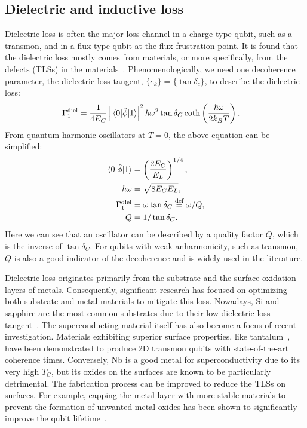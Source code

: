 \documentclass[a4paper,onecolumn,11pt,unpublished]{quantumarticle}
\newcommand{\setelem}[1]{\ensuremath{\{#1\}}}
\newcommand{\defeq}{\overset{\text{def}}{=}}
\begin{document}
\subsection{Dielectric and inductive loss}
Dielectric loss is often the major loss channel in a charge-type qubit, such as a transmon, and in a flux-type qubit at the flux frustration point.  It is found that the dielectric loss mostly comes from materials, or more specifically, from the defects (TLSs) in the materials~\cite{Martinis2005Decoherence}. Phenomenologically, we need one decoherence parameter, the dielectric loss tangent, $\setelem{e_k}=\setelem{\tan\delta_c}$, to describe the dielectric loss:
\begin{align}
  \Gamma_1^{\text{diel}} & = \frac{1}{4E_C}\left|\mel{0}{\hat{\phi}}{1}\right|^2\hbar \omega^2\tan\delta_C \coth\left(\frac{\hbar\omega}{2k_BT}\right). \label{eq:t1_dielectric}
\end{align}
From quantum harmonic oscillators at $T=0$, the above equation can be simplified:
\begin{align}
  \mel{0}{\hat{\phi}}{1} & = \left(\frac{2E_C}{E_L}\right)^{1/4}, \label{eq:phi01_lc}           \\
  \hbar\omega            & = \sqrt{8E_C E_L}, \label{eq:omega01_lc}                             \\
  \Gamma_1^{\text{diel}} & = \omega \tan\delta_C \defeq \omega / Q, \label{eq:t1_dielectric_lc} \\
  Q                      & = 1 / \tan\delta_C. \label{eq:q_dielectric_lc}
\end{align}
Here we can see that an oscillator can be described by a quality factor $Q$, which is the inverse of $\tan\delta_C$. For qubits with weak anharmonicity, such as transmon, $Q$ is also a good indicator of the decoherence and is widely used in the literature.

Dielectric loss originates primarily from the substrate and the surface oxidation layers of metals. Consequently, significant research has focused on optimizing both substrate and metal materials to mitigate this loss. Nowadays, Si and sapphire are the most common substrates due to their low dielectric loss tangent~\cite{Martinis2014UCSB}. The superconducting material itself has also become a focus of recent investigation. Materials exhibiting superior surface properties, like tantalum~\cite{Place2021New}, have been demonstrated to produce 2D transmon qubits with state-of-the-art coherence times\cite{Bland2025Millisecond}. Conversely, Nb is a good metal for superconductivity due to its very high $T_C$, but its oxides on the surfaces are known to be particularly detrimental. The fabrication process can be improved to reduce the TLSs on surfaces. For example, capping the metal layer with more stable materials to prevent the formation of unwanted metal oxides has been shown to significantly improve the qubit lifetime~\cite{Bal2024Systematic}.
\end{document}

